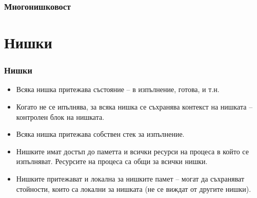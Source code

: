 \documentclass[ignorenonframetext, hyperref=unicode]{beamer}
\begin{document}
\begin{frame}\frametitle{Многонишковост}
\begin{figure}[h]
\center
{}
\end{figure}
\end{frame}

\section{Нишки}

\begin{frame}\frametitle{Нишки}
\begin{itemize}
\item Всяка нишка притежава състояние -- в изпълнение, готова, и т.н.
\item Когато не се ипълнява, за всяка нишка се съхранява контекст на нишката --
контролен блок на нишката.
\item Всяка нишка притежава собствен стек за изпълнение.
\item Нишките имат достъп до паметта и всички ресурси на процеса в който се
изпълняват. Ресурсите на процеса са общи за всички нишки.
\item Нишките притежават и локална за нишките памет -- могат да съхраняват
стойности, които са локални за нишката (не се виждат от другите нишки).
\end{itemize}
\end{frame}
\end{document}
